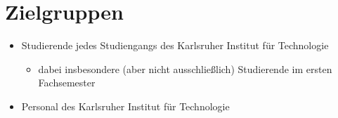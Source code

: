 \section{Zielgruppen}

\begin{itemize}
	\item Studierende jedes Studiengangs des Karlsruher Institut für Technologie
	\begin{itemize}
		\item dabei insbesondere (aber nicht ausschließlich) Studierende im ersten Fachsemester
	\end{itemize}
	\item Personal des Karlsruher Institut für Technologie
\end{itemize}